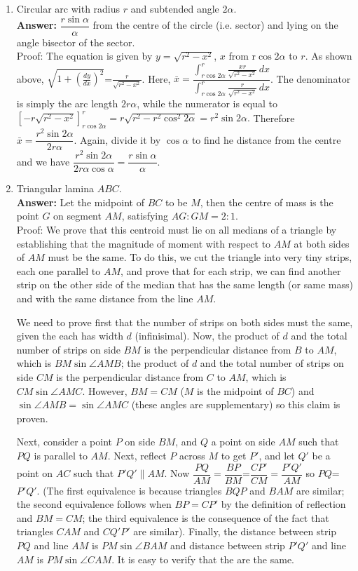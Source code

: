 \documentclass[11pt,a4paper]{article}
\begin{document}
\begin{enumerate}
\item Circular arc with radius $r$ and subtended angle $2\alpha$.\\
\textbf {Answer: }$\dfrac{r\sin\alpha}{\alpha}$ from the centre of the circle (i.e. sector) and lying on the angle bisector of the sector.\\
Proof: The equation is given by $y=\sqrt{r^2-x^2}$, $x$ from r$\cos 2\alpha$ to $r$. As shown above, $\sqrt{1+\left(\frac{dy}{dx}\right)^2}$=$\frac{r}{\sqrt{r^2-x^2}}$. Here, $\bar{x}=\dfrac{\int_{r\cos 2\alpha}^r \frac{xr}{\sqrt{r^2-x^2}}\, dx}{\int_{r\cos 2\alpha}^r \frac{r}{\sqrt{r^2-x^2}}\, dx}$. The denominator is simply the arc length $2r\alpha$, while the numerator is equal to $[-r\sqrt{r^2-x^2}]_{r\cos 2\alpha}^{r}=r\sqrt{r^2-r^2\cos^2 2\alpha}=r^2\sin 2\alpha.$ Therefore $\bar{x}=\dfrac{r^2\sin 2\alpha}{2r\alpha}$. Again, divide it by $\cos\alpha$ to find he distance from the centre and we have $\dfrac{r^2\sin 2\alpha}{2r\alpha\cos\alpha}=\dfrac{r\sin\alpha}{\alpha}.$
\item Triangular lamina $ABC$.\\
\textbf {Answer:} Let the midpoint of $BC$ to be $M$, then the centre of mass is the point $G$ on segment $AM$, satisfying $AG: GM=2:1$.\\
Proof: We prove that this centroid must lie on all medians of a triangle by establishing that the magnitude of moment with respect to $AM$ at both sides of $AM$  must be the same. To do this, we cut the triangle into very tiny strips, each one parallel to $AM$, and prove that for each strip, we can find another strip on the other side of the median that has the same length (or same mass) and with the same distance from the line $AM$.

We need to prove first that the number of strips on both sides must the same, given the each has width $d$ (infinisimal). Now, the product of $d$ and the total number of strips on side $BM$ is the perpendicular distance from $B$ to $AM$, which is $BM\sin\angle AMB$; the product of $d$ and the total number of strips on side $CM$ is the perpendicular distance from $C$ to $AM$, which is $CM\sin\angle AMC$. However, $BM=CM$ ($M$ is the midpoint of $BC$) and $\sin\angle AMB=\sin\angle AMC$ (these angles are supplementary) so this claim is proven.

Next, consider a point $P$ on side $BM$, and $Q$ a point on side $AM$ such that $PQ$ is parallel to $AM$. Next, reflect $P$ across $M$ to get $P'$, and let $Q'$ be a point on $AC$ such that $P'Q'\parallel AM$. Now $\dfrac{PQ}{AM}=\dfrac {BP}{BM}$=$\dfrac{CP'}{CM}=\dfrac{P'Q'}{AM}$ so $PQ$=$P'Q'$. (The first equivalence is because triangles $BQP$ and $BAM$ are similar; the second equivalence follows when $BP=CP'$ by the definition of reflection and $BM=CM$; the third equivalence is the consequence of the fact that triangles $CAM$ and $CQ'P'$ are similar). Finally, the distance between strip $PQ$ and line $AM$ is $PM\sin\angle BAM$ and distance between strip $P'Q'$ and line $AM$ is $PM\sin\angle CAM$. It is easy to verify that the are the same.


\end{enumerate}
\end{document}

